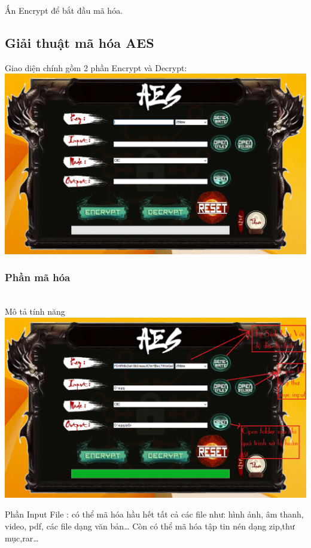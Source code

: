 \documentclass[paper=a4, fontsize=11pt]{scrartcl}	%
\numberwithin{equation}{section}															%
\numberwithin{figure}{section}																%
\numberwithin{table}{section}																%
\begin{document}
		Ấn Encrypt để bắt đầu mã hóa.\\
		
	\subsection{Giải thuật mã hóa AES}
	Giao diện chính gồm 2 phần Encrypt và Decrypt:\\
	
		\includegraphics[scale=0.4]{AES_BACKROUND}

 		\subsubsection{Phần mã hóa}\\
 		Mô tả tính năng \\
 		
 		\includegraphics[scale=0.4]{AES_MOTATINHNANG}
 		
 		Phần Input File : có thể mã hóa hầu hết tất cả các file như: hình ảnh, âm thanh, video, pdf, các file dạng văn bản… Còn có thể mã hóa tập tin nén dạng zip,thư mục,rar…\\
 		
\end{document}
